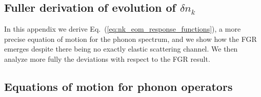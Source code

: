 \documentclass[aps,prd,notitlepage,amsfonts,amssymb,amsmath,nofootinbib,superscriptaddress,longbibliography]{revtex4-2}
\begin{document}



\newpage

\onecolumngrid
\begin{appendices}


\section{Fuller derivation of evolution of $\delta n_{k}$ \label{app:phonon_decay}}

In this appendix we derive Eq.~(\ref{eq:nk_eom_response_functions}), a more precise equation of motion for the phonon spectrum, and we show how the FGR emerges despite there being no exactly elastic scattering channel. We then analyze more fully the deviations with respect to the FGR result.


\subsection{Equations of motion for phonon operators}


\end{appendices}
\end{document}
